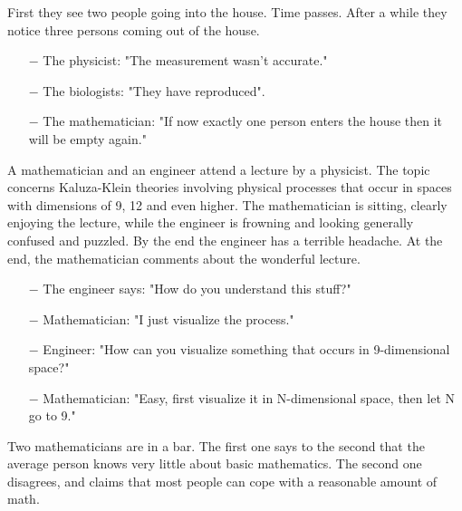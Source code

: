 First they see two people going into the house. Time passes. After a while they notice three persons coming out of the house. 

\begin{itemize}	 
	\item[$-$] The physicist: "The measurement wasn't accurate."

	\item[$-$] The biologists: "They have reproduced".

	\item[$-$] The mathematician: "If now exactly one person enters the house then it will be empty again."
\end{itemize}
	\begin{center}\underline{\hspace{5 cm}}\end{center}

A mathematician and an engineer attend a lecture by a physicist. The topic concerns Kaluza-Klein theories involving physical processes that occur in spaces with dimensions of 9, 12 and even higher. The mathematician is sitting, clearly enjoying the lecture, while the engineer is frowning and looking generally confused and puzzled. By the end the engineer has a terrible headache. At the end, the mathematician comments about the wonderful lecture. 

\begin{itemize}	 
	\item[$-$] The engineer says: "How do you understand this stuff?"

	\item[$-$] Mathematician: "I just visualize the process."

	\item[$-$] Engineer: "How can you visualize something that occurs in 9-dimensional space?"

	\item[$-$] Mathematician: "Easy, first visualize it in N-dimensional space, then let N go to 9."
\end{itemize}
	\begin{center}\underline{\hspace{5 cm}}\end{center}

Two mathematicians are in a bar. The first one says to the second that the average person knows very little about basic mathematics. The second one disagrees, and claims that most people can cope with a reasonable amount of math. 

